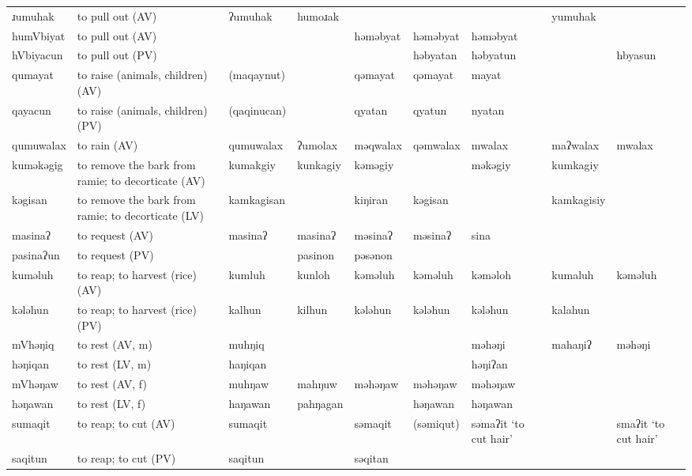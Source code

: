 \begin{landscape}
\begin{longtable}{*{9}{>{\raggedright\arraybackslash}p{}}}
\text{*}ɹumuhak      & to pull out (AV) & ʔumuhak & humoɹak &  &  &  & yumuhak & \\
\text{*}humVbiyat    & to pull out (AV) &  &  & həməbyat & həməbyat & həməbyat &  & \\
\text{*}hVbiyacun    & to pull out (PV) &  &  &  & həbyatan & həbyatun &  & hbyasun\\
\text{*}qumayat      & to raise (animals, children) (AV) & (maqaynut) &  & qəmayat & qəmayat & mayat &  & \\
\text{*}qayacun      & to raise (animals, children) (PV) & (qaqinucan) &  & qyatan & qyatun & nyatan &  & \\
\text{*}qumuwalax    & to rain (AV) & qumuwalax & ʔumolax & məqwalax & qəmwalax & mwalax & maʔwalax & mwalax\\
\text{*}kuməkəgig    & to remove the bark from ramie; to decorticate (AV) & kumakgiy & kunkagiy & kəməgiy &  & məkəgiy & kumkagiy & \\
\text{*}kəgisan      & to remove the bark from ramie; to decorticate (LV) & kamkagisan &  & kiŋiran & kəgisan &  & kamkagisiy & \\
\text{*}masinaʔ      & to request (AV) & masinaʔ & masinaʔ & məsinaʔ & məsinaʔ & sina &  & \\
\text{*}pasinaʔun    & to request (PV) &  & pasinon & pəsənon &  &  &  & \\
\text{*}kuməluh      & to reap; to harvest (rice) (AV) & kumluh & kunloh & kəməluh & kəməluh & kəməloh & kumaluh & kəməluh\\
\text{*}kələhun      & to reap; to harvest (rice) (PV) & kalhun & kilhun & kələhun & kələhun & kələhun & kalahun & \\
\text{*}mVhəŋiq      & to rest (AV, m) & muhŋiq &  &  &  & məhəŋi & mahaŋiʔ & məhəŋi\\
\text{*}həŋiqan      & to rest (LV, m) & haŋiqan &  &  &  & həŋiʔan &  & \\
\text{*}mVhəŋaw      & to rest (AV, f) & muhŋaw & mahŋuw & məhəŋaw & məhəŋaw & məhəŋaw &  & \\
\text{*}həŋawan      & to rest (LV, f) & haŋawan & pahŋagan &  & həŋawan & həŋawan &  & \\
\text{*}sumaqit      & to reap; to cut (AV) & sumaqit &  & səmaqit & (səmiqut) & səmaʔit \newline `to cut hair' &  & smaʔit \newline `to cut hair'\\
\text{*}saqitun      & to reap; to cut (PV) & saqitun &  & səqitan &  &  &  & \\

\end{longtable}
\end{landscape}
